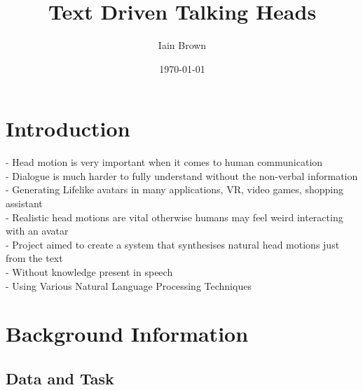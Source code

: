 \documentclass[bsc,frontabs,twoside,singlespacing,parskip]{infthesis}
\begin{document}
\title{Text Driven Talking Heads}

\author{Iain Brown}

\date{\today}
\maketitle
\tableofcontents

\chapter{Introduction}
- Head motion is very important when it comes to human communication\\
- Dialogue is much harder to fully understand without the non-verbal information\\
- Generating Lifelike avatars in many applications, VR, video games, shopping assistant \\
- Realistic head motions are vital otherwise humans may feel weird interacting with an avatar \\
- Project aimed to create a system that synthesises natural head motions just from the text \\
- Without knowledge present in speech\\
- Using Various Natural Language Processing Techniques \\

\chapter{Background Information}

\section{Data and Task}
\end{document}
